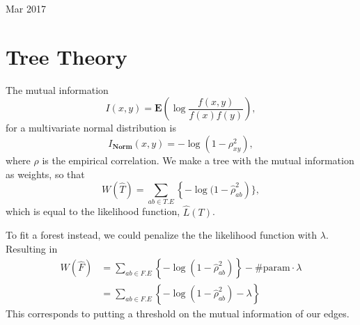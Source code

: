 \documentclass[12pt]{article}
\newcommand{\E}{\textbf{E}}
\newcommand{\N}{\textbf{Norm}}
\begin{document}
{\Large Mar 2017}
\section{Tree Theory}
The mutual information
$$ I(x,y) = \E \left(\log \frac{ f(x,y) }{ f(x) f(y) }\right), $$
for a multivariate normal distribution is 
$$ I_\N(x,y) = - \log( 1 - \rho_{xy}^2),$$
where $\rho$ is the empirical correlation. We make a tree with the mutual information as weights, so that 
$$ W(\hat T) = \sum_{ab\in T.E} \left\{ - \log(1 - \hat\rho_{ab}^2 \right)\},$$
which is equal to the likelihood function, $\hat L(T)$. 

To fit a forest instead, we could penalize the the likelihood function with $\lambda$. Resulting in 
\begin{align}
W(\hat F) &= \sum_{ab\in F.E} \left\{ - \log(1 - \hat\rho_{ab}^2) \right\} - \mathrm{\# param}\cdot \lambda \\
&= \sum_{ab\in F.E} \left\{ - \log(1 - \hat\rho_{ab}^2) - \lambda \right\} 
\end{align}
This corresponds to putting a threshold on the mutual information of our edges.
\end{document}
